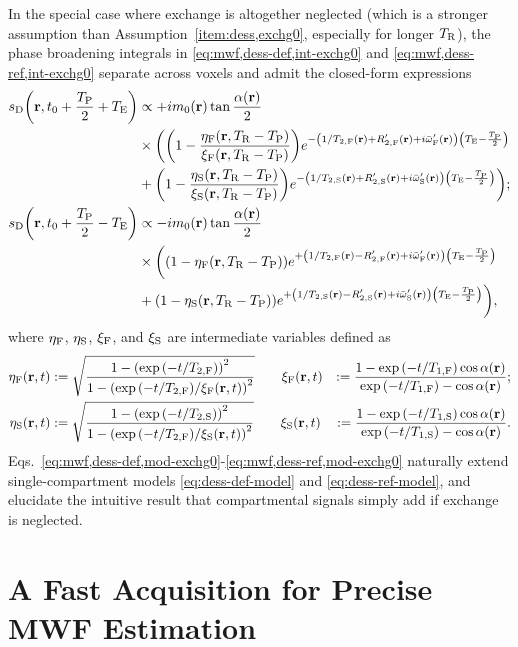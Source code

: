 In the special case
where exchange is altogether neglected
(which is a stronger assumption
than Assumption~\ref{item:dess,exchg0},
especially for longer $T_\mathrm{R}$),
the phase broadening integrals 
in \eqref{eq:mwf,dess-def,int-exchg0} and \eqref{eq:mwf,dess-ref,int-exchg0}
separate across voxels
and admit the closed-form expressions
\begin{align}
	\dess\paren{\bmr,t_0+\frac{\TP}{2}+\TE} &\propto
		+i\mzero\pr \tan{\frac{\flip\pr}{2}} 
		\label{eq:mwf,dess-def,mod-exchg0} \\
	&\times 
		\bigg(
			\paren{1-\frac{\etaf\paren{\bmr,\TR-\TP}}{\xif\paren{\bmr,\TR-\TP}}}
			e^{-\paren{1/\tf{2}\pr+\Rtpf\pr+i\ompfmed\pr}\paren{\TE-\frac{\TP}{2}}}
			\nonumber \\
	&+	
			\paren{1-\frac{\etas\paren{\bmr,\TR-\TP}}{\xis\paren{\bmr,\TR-\TP}}}
			e^{-\paren{1/\ts{2}\pr+\Rtps\pr+i\ompsmed\pr}\paren{\TE-\frac{\TP}{2}}}
		\bigg);
		\nonumber \\
	\dess\paren{\bmr,t_0+\frac{\TP}{2}-\TE} &\propto
		-i\mzero\pr \tan{\frac{\flip\pr}{2}}
		\label{eq:mwf,dess-ref,mod-exchg0} \\
	&\times
		\bigg(
			\paren{1-\etaf\paren{\bmr,\TR-\TP}}
			e^{+\paren{1/\tf{2}\pr-\Rtpf\pr+i\ompfmed\pr}\paren{\TE-\frac{\TP}{2}}}
			\nonumber \\
	&+
			\paren{1-\etas\paren{\bmr,\TR-\TP}}
			e^{+\paren{1/\ts{2}\pr-\Rtps\pr+i\ompsmed\pr}\paren{\TE-\frac{\TP}{2}}}
		\bigg),
		\nonumber
\end{align}
where $\eta_{\mathrm{F}}$, $\eta_{\mathrm{S}}$, $\xi_{\mathrm{F}}$, and $\xi_{\mathrm{S}}$ 
are intermediate variables defined as
\begin{align}
	\etaf\prt &:=
		\sqrt{\frac{1-\paren{\expa{-t/\tf{2}}}^2}{1-\paren{\expa{-t/\tf{2}}/\xif\prt}^2}}
		\qquad
	\xif\prt &:=
		\frac{1-\expa{-t/\tf{1}}\cos{\flip\pr}}{\expa{-t/\tf{1}}-\cos{\flip\pr}};
		\nonumber \\
	\etas\prt &:=
		\sqrt{\frac{1-\paren{\expa{-t/\ts{2}}}^2}{1-\paren{\expa{-t/\tf{2}}/\xis\prt}^2}}
		\qquad
	\xis\prt &:=
		\frac{1-\expa{-t/\ts{1}}\cos{\flip\pr}}{\expa{-t/\ts{1}}-\cos{\flip\pr}}.
		\nonumber
\end{align}
Eqs.~\eqref{eq:mwf,dess-def,mod-exchg0}-\eqref{eq:mwf,dess-ref,mod-exchg0}
naturally extend single-compartment models
\eqref{eq:dess-def-model} and \eqref{eq:dess-ref-model},
and elucidate the intuitive result
that compartmental signals simply add
if exchange is neglected.

\section{A Fast Acquisition for Precise MWF Estimation}
\label{s,mwf,acq}

